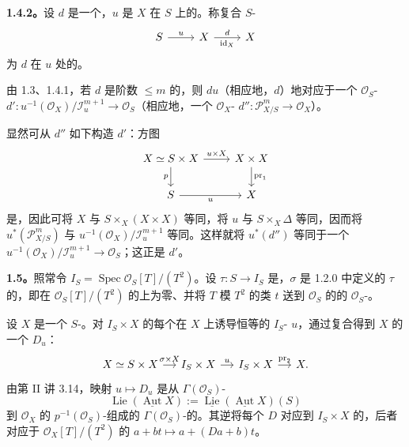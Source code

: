 \textbf{1.4.2。}设 $d$ 是一个，$u$ 是 $X$ 在 $S$ 上的。称复合 $S$-
\[
\begin{tikzcd}S\arrow[r,"u"]&X\arrow[r,"d","\operatorname{id}_X"']&X\end{tikzcd}
\]
为 $d$ 在 $u$ 处的。

由 1.3、1.4.1，若 $d$ 是阶数 $\leq m$ 的，则 $du$（相应地，$d$）地对应于一个 $\mathcal O_S$- $d':u^{-1}(\mathcal O_X)/\mathcal I_u^{m+1}\to\mathcal O_S$（相应地，一个 $\mathcal O_X$- $d'':\mathcal P_{X/S}^m\to\mathcal O_X$）。

显然可从 $d''$ 如下构造 $d'$：方图
\[
\begin{tikzcd}
X\simeq S\times X\arrow[r,"u\times X"]\arrow[d,"p"']&X\times X\arrow[d,"\operatorname{pr}_1"]\\
S\arrow[r,"u"']&X
\end{tikzcd}
\]
是，因此可将 $X$ 与 $S\times_X(X\times X)$ 等同，将 $u$ 与 $S\times_X\Delta$ 等同，因而将 $u^*(\mathcal P_{X/S}^m)$ 与 $u^{-1}(\mathcal O_X)/\mathcal I_u^{m+1}$ 等同。这样就将 $u^*(d'')$ 等同于一个 $u^{-1}(\mathcal O_X)/\mathcal I_u^{m+1}\to\mathcal O_S$；这正是 $d'$。

\textbf{1.5。}照常令 $I_S=\operatorname{Spec}\mathcal O_S[T]/(T^2)$。设 $\tau:S\to I_S$ 是，$\sigma$ 是 1.2.0 中定义的 $\tau$ 的，即在 $\mathcal O_S[T]/(T^2)$ 的上为零、并将 $T$ 模 $T^2$ 的类 $t$ 送到 $\mathcal O_S$ 的的 $\mathcal O_S$-。

设 $X$ 是一个 $S$-。对 $I_S\times X$ 的每个在 $X$ 上诱导恒等的 $I_S$- $u$，通过复合得到 $X$ 的一个 $D_u$：
\[
\begin{tikzcd}[column sep=small]
X\simeq S\times X\arrow[r,"\sigma\times X"]&I_S\times X\arrow[r,"u"]&I_S\times X\arrow[r,"\operatorname{pr}_2"]&X.
\end{tikzcd}
\]
由第 II 讲 3.14，映射 $u\mapsto D_u$ 是从 $\Gamma(\mathcal O_S)$-
\[
\operatorname{Lie}(\underline{\operatorname{Aut}}X):=\underline{\operatorname{Lie}}(\underline{\operatorname{Aut}}X)(S)
\]
到 $\mathcal O_X$ 的 $p^{-1}(\mathcal O_S)$-组成的 $\Gamma(\mathcal O_S)$-的。其逆将每个 $D$ 对应到 $I_S\times X$ 的，后者对应于 $\mathcal O_X[T]/(T^2)$ 的 $a+bt\mapsto a+(Da+b)t$。

